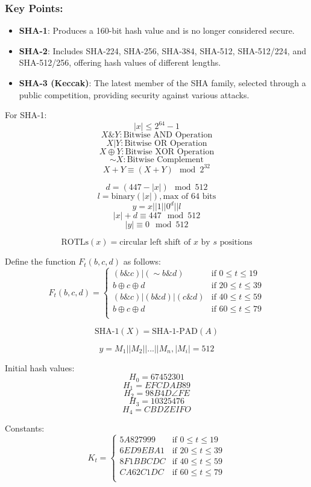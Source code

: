 \documentclass[11pt]{article}
\begin{document}
\subsubsection{Key Points:}
\begin{itemize}
    \item \textbf{SHA-1}: Produces a 160-bit hash value and is no longer considered secure.
    \item \textbf{SHA-2}: Includes SHA-224, SHA-256, SHA-384, SHA-512, SHA-512/224, and SHA-512/256, offering hash values of different lengths.
    \item \textbf{SHA-3 (Keccak)}: The latest member of the SHA family, selected through a public competition, providing security against various attacks.
\end{itemize}


For SHA-1:
\[ |x| \leq 2^{64} - 1 \]
\[ X \& Y: \text{Bitwise AND Operation} \]
\[ X | Y: \text{Bitwise OR Operation} \]
\[ X \oplus Y: \text{Bitwise XOR Operation} \]
\[ \sim X: \text{Bitwise Complement} \]
\[ X + Y \equiv (X + Y) \mod 2^{32} \]

\[ d = (447 - |x|) \mod 512 \]
\[ l = \text{binary}(|x|), \text{max of 64 bits} \]
\[ y = x || 1 || 0^d || l \]
\[ |x| + d \equiv 447 \mod 512 \]
\[ |y| \equiv 0 \mod 512 \]

\[ \text{ROTLs}(x) = \text{circular left shift of } x \text{ by } s \text{ positions} \]

Define the function \( F_t(b,c,d) \) as follows:
\[
F_t(b,c,d) =
\begin{cases}
(b \& c) | (\sim b \& d) & \text{if } 0 \leq t \leq 19 \\
b \oplus c \oplus d & \text{if } 20 \leq t \leq 39 \\
(b \& c) | (b \& d) | (c \& d) & \text{if } 40 \leq t \leq 59 \\
b \oplus c \oplus d & \text{if } 60 \leq t \leq 79 \\
\end{cases}
\]

\[ \text{SHA-1}(X) = \text{SHA-1-PAD}(A) \]

\[ y = M_1 || M_2 || ... || M_n, |M_i| = 512 \]

Initial hash values:
\[ H_0 = 67452301 \]
\[ H_1 = EFCDAB89 \]
\[ H_2 = 98B4D\angle{FE} \]
\[ H_3 = 10325476 \]
\[ H_4 = CBDZEIFO \]

Constants:
\[ K_t =
\begin{cases}
5A827999 & \text{if } 0 \leq t \leq 19 \\
6ED9EBA1 & \text{if } 20 \leq t \leq 39 \\
8F1BBCDC & \text{if } 40 \leq t \leq 59 \\
CA62C1DC & \text{if } 60 \leq t \leq 79 \\
\end{cases}
\]
\end{document}
